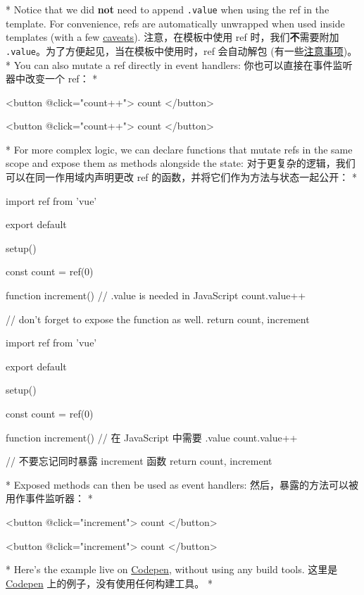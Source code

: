 \begin{paracol}{2}
\switchcolumn[0]*%
Notice that we did \textbf{not} need to append \texttt{.value} when
using the ref in the template. For convenience, refs are automatically
unwrapped when used inside templates (with a few
\href{https://vuejs.org/guide/essentials/reactivity-fundamentals.html\#caveat-when-unwrapping-in-templates}{caveats}).
\switchcolumn
注意，在模板中使用 ref 时，我们\textbf{不}需要附加
\texttt{.value}。为了方便起见，当在模板中使用时，ref 会自动解包
(有一些\href{https://cn.vuejs.org/guide/essentials/reactivity-fundamentals.html\#caveat-when-unwrapping-in-templates}{注意事项})。
\switchcolumn[0]*%
You can also mutate a ref directly in event handlers:
\switchcolumn
你也可以直接在事件监听器中改变一个 ref：
\switchcolumn[0]*%
\begin{codeHtml}
<button @click="count++">
{{ count }}
</button>
\end{codeHtml}  
\switchcolumn
\begin{codeHtml}
<button @click="count++">
{{ count }}
</button>
\end{codeHtml}  

\switchcolumn[0]*%
For more complex logic, we can declare functions that mutate refs in the
same scope and expose them as methods alongside the state:
\switchcolumn
对于更复杂的逻辑，我们可以在同一作用域内声明更改 ref
的函数，并将它们作为方法与状态一起公开：
\switchcolumn[0]*%
\begin{codeJs}
import { ref } from 'vue'

export default {
    setup() {
    const count = ref(0)

    function increment() {
        // .value is needed in JavaScript
        count.value++
    }

    // don't forget to expose the function as well.
    return {
        count,
        increment
    }
    }
}
\end{codeJs}
\switchcolumn
\begin{codeJs}
import { ref } from 'vue'

export default {
    setup() {
    const count = ref(0)

    function increment() {
        // 在 JavaScript 中需要 .value
        count.value++
    }

    // 不要忘记同时暴露 increment 函数
    return {
        count,
        increment
    }
    }
}
\end{codeJs}

\switchcolumn[0]*%
Exposed methods can then be used as event handlers:
\switchcolumn
然后，暴露的方法可以被用作事件监听器：
\switchcolumn[0]*%
\begin{codeHtml}
<button @click="increment">
{{ count }}
</button>
\end{codeHtml}  
\switchcolumn
\begin{codeHtml}
<button @click="increment">
{{ count }}
</button>
\end{codeHtml}  
\switchcolumn[0]*%
Here's the example live on
\href{https://codepen.io/vuejs-examples/pen/WNYbaqo}{Codepen}, without
using any build tools.
\switchcolumn
这里是 \href{https://codepen.io/vuejs-examples/pen/WNYbaqo}{Codepen}
上的例子，没有使用任何构建工具。
\switchcolumn[0]*%

\end{paracol}

